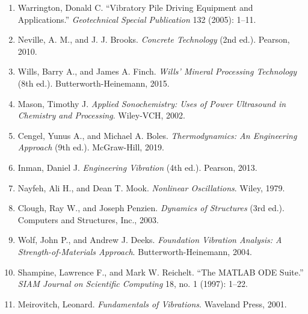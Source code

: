 \documentclass[12pt,a4paper]{article}
\begin{document}
\begin{enumerate}
\item Warrington, Donald C. ``Vibratory Pile Driving Equipment and Applications.'' \emph{Geotechnical Special Publication} 132 (2005): 1--11.

\item Neville, A. M., and J. J. Brooks. \emph{Concrete Technology} (2nd ed.). Pearson, 2010.

\item Wills, Barry A., and James A. Finch. \emph{Wills' Mineral Processing Technology} (8th ed.). Butterworth-Heinemann, 2015.

\item Mason, Timothy J. \emph{Applied Sonochemistry: Uses of Power Ultrasound in Chemistry and Processing}. Wiley-VCH, 2002.

\item Cengel, Yunus A., and Michael A. Boles. \emph{Thermodynamics: An Engineering Approach} (9th ed.). McGraw-Hill, 2019.

\item Inman, Daniel J. \emph{Engineering Vibration} (4th ed.). Pearson, 2013.

\item Nayfeh, Ali H., and Dean T. Mook. \emph{Nonlinear Oscillations}. Wiley, 1979.

\item Clough, Ray W., and Joseph Penzien. \emph{Dynamics of Structures} (3rd ed.). Computers and Structures, Inc., 2003.

\item Wolf, John P., and Andrew J. Deeks. \emph{Foundation Vibration Analysis: A Strength-of-Materials Approach}. Butterworth-Heinemann, 2004.

\item Shampine, Lawrence F., and Mark W. Reichelt. ``The MATLAB ODE Suite.'' \emph{SIAM Journal on Scientific Computing} 18, no. 1 (1997): 1--22.

\item Meirovitch, Leonard. \emph{Fundamentals of Vibrations}. Waveland Press, 2001.

\end{enumerate}
\end{document}
